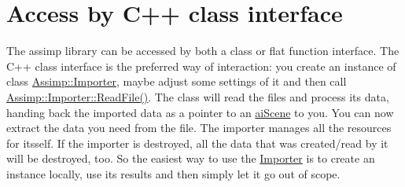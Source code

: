 \hypertarget{usage_access_cpp}{}\section{Access by C++ class interface}\label{usage_access_cpp}
The assimp library can be accessed by both a class or flat function interface. The C++ class interface is the preferred way of interaction\+: you create an instance of class \hyperlink{class_assimp_1_1_importer}{Assimp\+::\+Importer}, maybe adjust some settings of it and then call \hyperlink{class_assimp_1_1_importer_afa338a135a56956bd5deb7d238498dde}{Assimp\+::\+Importer\+::\+Read\+File()}. The class will read the files and process its data, handing back the imported data as a pointer to an \hyperlink{structai_scene}{ai\+Scene} to you. You can now extract the data you need from the file. The importer manages all the resources for itsself. If the importer is destroyed, all the data that was created/read by it will be destroyed, too. So the easiest way to use the \hyperlink{class_importer}{Importer} is to create an instance locally, use its results and then simply let it go out of scope.

